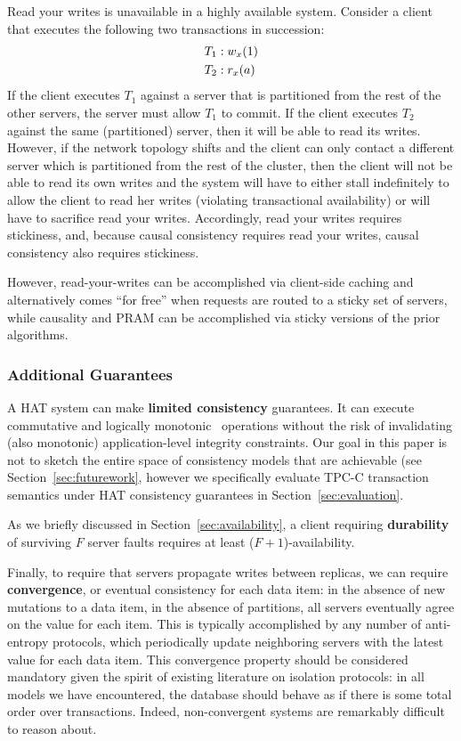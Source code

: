 Read your writes is unavailable in a highly available system. Consider
a client that executes the following two transactions in succession:
\vspace{-.5em}
\begin{align*}
\small
T_1 &: w_x(1)
\\T_2 &: r_x(a)
\end{align*}
If the client executes $T_1$ against a server that is partitioned from
the rest of the other servers, the server must allow $T_1$ to
commit. If the client executes $T_2$ against the same (partitioned)
server, then it will be able to read its writes. However, if the
network topology shifts and the client can only contact a different
server which is partitioned from the rest of the cluster, then the
client will not be able to read its own writes and the system will
have to either stall indefinitely to allow the client to read her
writes (violating transactional availability) or will have to
sacrifice read your writes. Accordingly, read your writes requires
stickiness, and, because causal consistency requires read your writes,
causal consistency also requires stickiness.

However, read-your-writes can be accomplished via client-side caching
and alternatively comes ``for free'' when requests are routed to a
sticky set of servers, while causality and PRAM can be accomplished
via sticky versions of the prior algorithms.

\subsubsection{Additional Guarantees}

A HAT system can make \textbf{limited consistency} guarantees. It can
execute commutative and logically monotonic~\cite{needed} operations
without the risk of invalidating (also monotonic) application-level
integrity constraints. Our goal in this paper is not to sketch the
entire space of consistency models that are achievable (see
Section~\ref{sec:futurework}, however we specifically evaluate TPC-C
transaction semantics under HAT consistency guarantees in
Section~\ref{sec:evaluation}.

As we briefly discussed in Section~\ref{sec:availability}, a client
requiring \textbf{durability} of surviving $F$ server faults requires
at least ($F+1$)-availability.

Finally, to require that servers propagate writes between replicas, we
can require \textbf{convergence}, or eventual consistency for each
data item: in the absence of new mutations to a data item, in the
absence of partitions, all servers eventually agree on the value for
each item. This is typically accomplished by any number of
anti-entropy protocols, which periodically update neighboring servers
with the latest value for each data item. This convergence property
should be considered mandatory given the spirit of existing literature
on isolation protocols: in all models we have encountered, the
database should behave as if there is some total order over
transactions. Indeed, non-convergent systems are remarkably difficult
to reason about.

